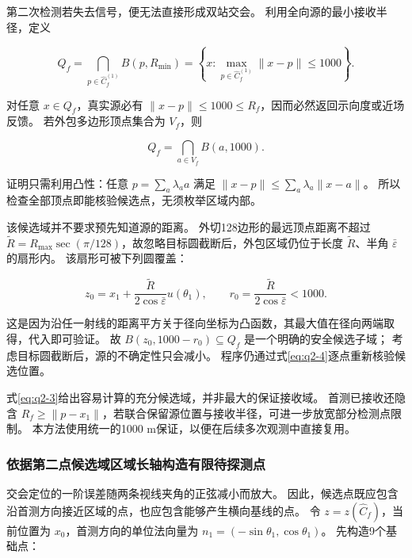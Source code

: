 第二次检测若失去信号，便无法直接形成双站交会。
利用全向源的最小接收半径，定义

\begin{equation}\label{eq:q2-3}
Q_f=\bigcap_{p\in\widehat C_f^{(1)}}B(p,R_{\min})
=\left\{x:\max_{p\in\widehat C_f^{(1)}}\|x-p\|\le1000\right\}.
\end{equation}

对任意 \(x\in Q_f\)，真实源必有 \(\|x-p\|\le1000\le R_f\)，因而必然返回示向度或近场反馈。
若外包多边形顶点集合为 \(V_f\)，则

\begin{equation}\label{eq:q2-4}
Q_f=\bigcap_{a\in V_f}B(a,1000).
\end{equation}

证明只需利用凸性：任意 \(p=\sum_a\lambda_a a\) 满足 \(\|x-p\|\le\sum_a\lambda_a\|x-a\|\)。
所以检查全部顶点即能核验候选点，无须枚举区域内部。

\begin{sloppypar}
该候选域并不要求预先知道源的距离。
外切128边形的最远顶点距离不超过 \(\widetilde R=R_{\max}\sec(\pi/128)\)，故忽略目标圆截断后，外包区域仍位于长度 \(\widetilde R\)、半角 \(\bar\varepsilon\) 的扇形内。
该扇形可被下列圆覆盖：
\end{sloppypar}

\begin{equation}\label{eq:q2-5}
z_0=x_1+\frac{\widetilde R}{2\cos\bar\varepsilon}u(\theta_1),
\qquad r_0=\frac{\widetilde R}{2\cos\bar\varepsilon}<1000.
\end{equation}

这是因为沿任一射线的距离平方关于径向坐标为凸函数，其最大值在径向两端取得，代入即可验证。
故 \(B(z_0,1000-r_0)\subseteq Q_f\) 是一个明确的安全候选子域；
考虑目标圆截断后，源的不确定性只会减小。
程序仍通过式\eqref{eq:q2-4}逐点重新核验候选位置。

式\eqref{eq:q2-3}给出容易计算的充分候选域，并非最大的保证接收域。
首测已接收还隐含 \(R_f\ge\|p-x_1\|\)，若联合保留源位置与接收半径，可进一步放宽部分检测点限制。
本方法使用统一的1000 m保证，以便在后续多次观测中直接复用。

\subsubsection{依据第二点候选域区域长轴构造有限待探测点}\label{sec:q2-3}

交会定位的一阶误差随两条视线夹角的正弦减小而放大。
因此，候选点既应包含沿首测方向接近区域的点，也应包含能够产生横向基线的点。
令 \(z=z(\widehat C_f)\)，当前位置为 \(x_0\)，首测方向的单位法向量为 \(n_1=(-\sin\theta_1,\cos\theta_1)\)。
先构造9个基础点：

